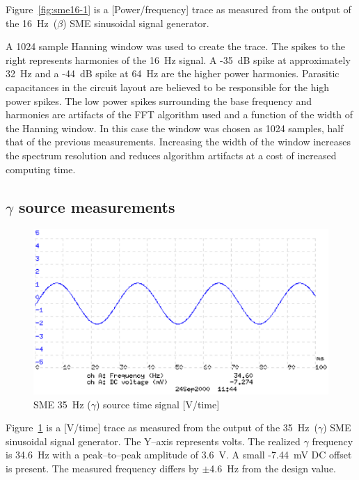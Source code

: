 Figure~\ref{fig:sme16-1} is a [Power/frequency] trace as measured from
the output of the 16~Hz~($\beta$) SME sinusoidal signal generator.

A 1024 sample Hanning window was used to create the trace. The spikes
to the right represents harmonies of the 16~Hz signal. A -35~dB spike
at approximately 32~Hz and a -44~dB spike at 64~Hz are the higher
power harmonies. Parasitic capacitances in the circuit layout are
believed to be responsible for the high power spikes. The low power
spikes surrounding the base frequency and harmonies are artifacts of
the FFT algorithm used and a function of the width of the Hanning
window. In this case the window was chosen as 1024 samples, half that
of the previous measurements. Increasing the width of the window
increases the spectrum resolution and reduces algorithm artifacts at a
cost of increased computing time.


\subsection{$\gamma$ source measurements}

\begin{figure}[htbp]
\begin{center}
	\includegraphics[width=\textwidth]{SME352.ps}
    \caption{SME 35~Hz ($\gamma$) source time signal [V/time]}
    \label{fig:sme35-2}
\end{center}
\end{figure}

Figure~\ref{fig:sme35-2} is a [V/time] trace as measured from the
output of the 35~Hz~($\gamma$) SME sinusoidal signal generator. The
Y--axis represents volts. The realized $\gamma$ frequency is 34.6~Hz
with a peak--to--peak amplitude of 3.6~V. A small -7.44~mV DC offset
is present. The measured frequency differs by $\pm$4.6~Hz from the
design value.


